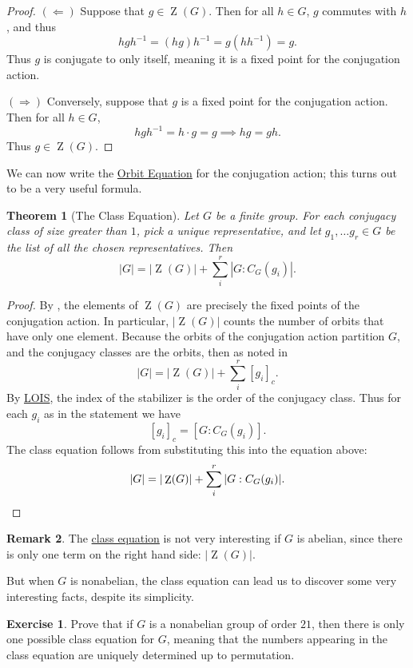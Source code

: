 \documentclass[12pt]{report}
\newtheorem{theorem}{Theorem}[chapter]
\numberwithin{equation}{section}
\numberwithin{theorem}{chapter}
\theoremstyle{definition}
\newtheorem{exercise}{Exercise}
\newtheorem*{basic properties}{Basic Properties}
\newtheorem*{Important Remark}{Important Remark}
\newtheorem{remark}[theorem]{Remark}
\DeclareMathOperator{\Zc}{Z}
\begin{document}
\begin{proof}
$(\Leftarrow)$ Suppose that $g \in \Zc(G)$. Then for all $h \in G$, $g$ commutes with $h$, and thus
$$hgh^{-1} = (hg)h^{-1} = g(hh^{-1}) = g.$$
Thus $g$ is conjugate to only itself, meaning it is a fixed point for the conjugation action. 

$(\Rightarrow)$ Conversely, suppose that $g$ is a fixed point for the conjugation action. Then for all $h \in G$,
$$hgh^{-1} = h \cdot g = g \implies hg=gh.$$
Thus $g \in \Zc(G)$.	
\end{proof}


We can now write the \hyperref[Orbit Equation]{Orbit Equation} for the conjugation action; this turns out to be a very useful formula.

\begin{theorem}[The Class Equation]\label{class equation}
Let $G$ be a finite group. For each conjugacy class of size greater than $1$, pick a unique representative, and let $g_1,\ldots g_r \in G$ be the list of all the chosen representatives. Then 
$$|G| = |\Zc(G)| + \sum_i^r |G : C_G(g_i)|.$$
\end{theorem}

\begin{proof}
 By , the elements of $\Zc(G)$ are precisely the fixed points of the conjugation action. In particular, $|\Zc(G)|$ counts the number of orbits that have only one element. Because the orbits of the conjugation action partition $G$, and the conjugacy classes are the orbits, then as noted in 
$$|G| = |\Zc(G)| + \sum_i^r [g_i]_c.$$
By \hyperref[lois]{LOIS}, the index of the stabilizer is the order of the conjugacy class. Thus for each $g_i$ as in the statement we have 
$$[g_i]_c = [G: C_G(g_i)].$$ 
The class equation follows from substituting this into the equation above:
$$|G| = |\Zc(G)| + \sum_i^r |G : C_G(g_i)|.\qedhere$$
\end{proof}



\begin{remark}
	The \hyperref[Class Equation]{class equation} is not very interesting if $G$ is abelian, since there is only one term on the right hand side: $|\Zc(G)|$.
\end{remark}

But when $G$ is nonabelian, the class equation can lead us to discover some very interesting facts, despite its simplicity.

\begin{exercise}
Prove that if $G$ is a nonabelian group of order $21$, then there is only one possible class equation for $G$, meaning that the numbers appearing in the class equation are uniquely determined up to permutation.
\end{exercise}
\end{document}
